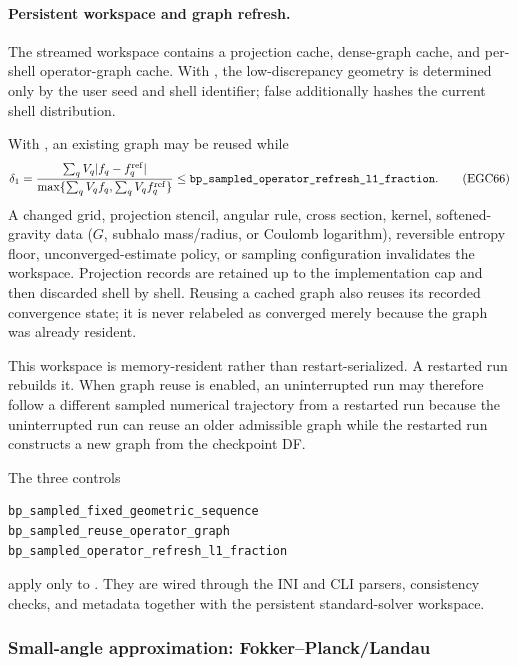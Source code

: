 \paragraph{Persistent workspace and graph refresh.}
The streamed workspace contains a projection cache, dense-graph cache, and
per-shell operator-graph cache.  With
, the low-discrepancy geometry
is determined only by the user seed and shell identifier; false additionally
hashes the current shell distribution.

With , an existing graph may be
reused while
\[
 \delta_1=
 \frac{\sum_qV_q|f_q-f_q^{\rm ref}|}
 {\max\{\sum_qV_qf_q,\sum_qV_qf_q^{\rm ref}\}}
 \le
 \code{bp_sampled_operator_refresh_l1_fraction}.         \tag{EGC66}
\]
A changed grid, projection stencil, angular rule, cross section, kernel,
softened-gravity data (\(G\), subhalo mass/radius, or Coulomb logarithm),
reversible entropy floor, unconverged-estimate policy, or sampling
configuration invalidates the workspace.  Projection records are retained up
to the implementation cap and then discarded shell by shell.  Reusing a
cached graph also reuses its recorded convergence state; it is never relabeled
as converged merely because the graph was already resident.

This workspace is memory-resident rather than restart-serialized.  A restarted
run rebuilds it.  When graph reuse is enabled, an uninterrupted run may
therefore follow a different sampled numerical trajectory from a restarted
run because the uninterrupted run can reuse an older admissible graph while
the restarted run constructs a new graph from the checkpoint DF.

The three controls
\begin{lstlisting}
bp_sampled_fixed_geometric_sequence
bp_sampled_reuse_operator_graph
bp_sampled_operator_refresh_l1_fraction
\end{lstlisting}
apply only to .  They are wired through
the INI and CLI parsers, consistency checks, and metadata together with the
persistent standard-solver workspace.

\subsubsection{Small-angle approximation: Fokker--Planck/Landau}

